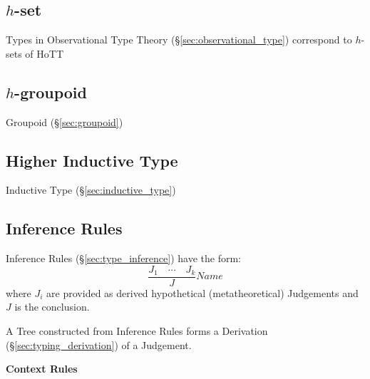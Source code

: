 \subsection{$h$-set}\label{sec:h_set}

Types in Observational Type Theory (\S\ref{sec:observational_type})
correspond to $h$-sets of HoTT



\subsection{$h$-groupoid}\label{sec:h_groupoid}

Groupoid (\S\ref{sec:groupoid})



\subsection{Higher Inductive Type}\label{sec:higher_inductive_type}

\fist Inductive Type (\S\ref{sec:inductive_type})




\subsection{Inference Rules}\label{sec:homotopy_rules}

Inference Rules (\S\ref{sec:type_inference}) have the form:
\[
  \frac{J_1 \quad \cdots \quad J_k} {J} Name
\]
where $J_i$ are provided as derived hypothetical (metatheoretical)
Judgements and $J$ is the conclusion.

A Tree constructed from Inference Rules forms a Derivation
(\S\ref{sec:typing_derivation}) of a Judgement.



\textbf{Context Rules}

